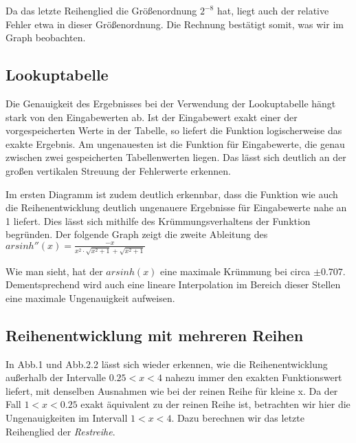 \documentclass[course=erap] {aspdoc}
\begin{document}
    Da das letzte Reihenglied die Größenordnung $2^{-8}$ hat, liegt auch der relative Fehler etwa in dieser Größenordnung. Die Rechnung bestätigt somit, was wir im Graph beobachten.
    \subsection{Lookuptabelle}
    Die Genauigkeit des Ergebnisses bei der Verwendung der Lookuptabelle hängt stark von den Eingabewerten ab. Ist der Eingabewert exakt einer der vorgespeicherten Werte in der Tabelle, so liefert die Funktion logischerweise das exakte Ergebnis. Am ungenauesten ist die Funktion für Eingabewerte, die genau zwischen zwei gespeicherten Tabellenwerten liegen. Das lässt sich deutlich an der großen vertikalen Streuung der Fehlerwerte erkennen.
    
    Im ersten Diagramm ist zudem deutlich erkennbar, dass die Funktion wie auch die Reihenentwicklung deutlich ungenauere Ergebnisse für Eingabewerte nahe an 1 liefert. Dies lässt sich mithilfe des Krümmungsverhaltens der Funktion begründen. Der folgende Graph zeigt die zweite Ableitung des $arsinh''(x) = \frac{-x}{x^2\cdot \sqrt{x^2+1}+\sqrt{x^2+1}}$

    

    Wie man sieht, hat der $arsinh(x)$ eine maximale Krümmung bei circa $\pm 0.707$. Dementsprechend wird auch eine lineare Interpolation im Bereich dieser Stellen eine maximale Ungenauigkeit aufweisen.
    


    
    \subsection{Reihenentwicklung mit mehreren Reihen}
    In Abb.1 und Abb.2.2 lässt sich wieder erkennen, wie die Reihenentwicklung außerhalb der Intervalle $0.25<x<4$ nahezu immer den exakten Funktionswert liefert, mit denselben Ausnahmen wie bei der reinen Reihe für kleine x.
    Da der Fall $1<x<0.25$ exakt äquivalent zu der reinen Reihe ist, betrachten wir hier die Ungenauigkeiten im Intervall $1<x<4$. Dazu berechnen wir das letzte Reihenglied der \textit{Restreihe}.
    
\end{document}
